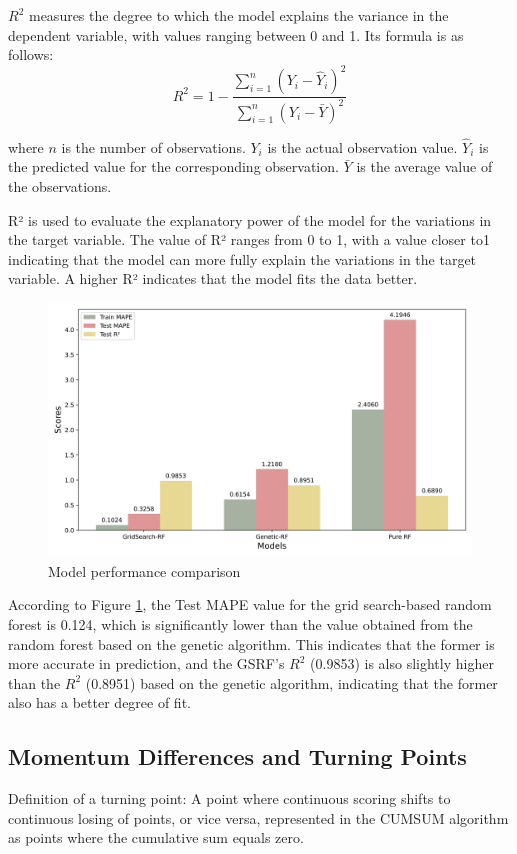 \documentclass[12pt]{article}%
\begin{document}
$R^2$ measures the degree to which the model explains the variance in the dependent variable, with values ranging between 0 and 1. Its formula is as follows:
\begin{equation}
	R^2 = 1 - \frac{\sum_{i=1}^{n} (Y_i - \hat{Y}_i)^2}{\sum_{i=1}^{n} (Y_i - \bar{Y})^2}
\end{equation}

where $ n $ is the number of observations.
$ Y_i $ is the actual observation value.
$\hat{Y}_i $ is the predicted value for the corresponding observation.
$\bar{Y} $ is the average value of the observations.

R² is used to evaluate the explanatory power of the model for the variations in the target variable. The value of R² ranges from 0 to 1, with a value closer to1 indicating that the model can more fully explain the variations in the target variable. A higher R² indicates that the model fits the data better.

\begin{figure}[H]
	\centering
	\includegraphics[scale=0.5]{figure//sl2.png}
	\caption{Model performance comparison}
	\label{sl2}
\end{figure}

According to Figure \ref{sl2}, the Test MAPE value for the grid search-based random forest is 0.124, which is significantly lower than the value obtained from the random forest based on the genetic algorithm. This indicates that the former is more accurate in prediction, and the GSRF's $R^2$ (0.9853) is also slightly higher than the $R^2$ (0.8951) based on the genetic algorithm, indicating that the former also has a better degree of fit.


\subsection{Momentum Differences and Turning Points}
Definition of a turning point: A point where continuous scoring shifts to continuous losing of points, or vice versa, represented in the CUMSUM algorithm as points where the cumulative sum equals zero.
\end{document}
